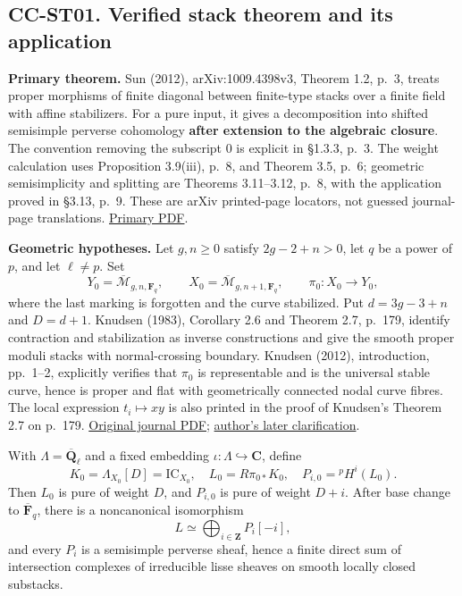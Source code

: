 \documentclass[11pt,a4paper]{article}
\theoremstyle{definition}\newtheorem{definition}[theorem]{Definition}
\theoremstyle{remark}\newtheorem{remark}[theorem]{Remark}
\begin{document}
\subsection{CC-ST01. Verified stack theorem and its
application}\label{cc-st01.-verified-stack-theorem-and-its-application}

\textbf{Primary theorem.} Sun (2012), arXiv:1009.4398v3, Theorem 1.2,
p.~3, treats proper morphisms of finite diagonal between finite-type
stacks over a finite field with affine stabilizers. For a pure input, it
gives a decomposition into shifted semisimple perverse cohomology
\textbf{after extension to the algebraic closure}. The convention
removing the subscript 0 is explicit in §1.3.3, p.~3. The weight
calculation uses Proposition 3.9(iii), p.~8, and Theorem 3.5, p.~6;
geometric semisimplicity and splitting are Theorems 3.11--3.12, p.~8,
with the application proved in §3.13, p.~9. These are arXiv printed-page
locators, not guessed journal-page translations.
\href{https://arxiv.org/pdf/1009.4398v3}{Primary PDF}.

\textbf{Geometric hypotheses.} Let \(g,n\geq0\) satisfy \(2g-2+n>0\),
let \(q\) be a power of \(p\), and let \(\ell\ne p\). Set \[
Y_0=\overline{\mathcal M}_{g,n,\mathbf F_q},\qquad
X_0=\overline{\mathcal M}_{g,n+1,\mathbf F_q},\qquad
\pi_0:X_0\longrightarrow Y_0,
\] where the last marking is forgotten and the curve stabilized. Put
\(d=3g-3+n\) and \(D=d+1\). Knudsen (1983), Corollary 2.6 and Theorem
2.7, p.~179, identify contraction and stabilization as inverse
constructions and give the smooth proper moduli stacks with
normal-crossing boundary. Knudsen (2012), introduction, pp.~1--2,
explicitly verifies that \(\pi_0\) is representable and is the universal
stable curve, hence is proper and flat with geometrically connected
nodal curve fibres. The local expression \(t_i\mapsto xy\) is also
printed in the proof of Knudsen's Theorem 2.7 on p.~179.
\href{https://journals.msp.org/mscand/article/download/1622/1621/1653}{Original
journal PDF}; \href{https://arxiv.org/pdf/1106.1588v2}{author's later
clarification}.

With \(\Lambda=\overline{\mathbf Q}_\ell\) and a fixed embedding
\(\iota:\Lambda\hookrightarrow\mathbf C\), define \[
K_0=\Lambda_{X_0}[D]=\mathrm{IC}_{X_0},\quad
L_0=R\pi_{0*}K_0,\quad
P_{i,0}={}^p\!H^i(L_0).
\] Then \(L_0\) is pure of weight \(D\), and \(P_{i,0}\) is pure of
weight \(D+i\). After base change to \(\overline{\mathbf F}_q\), there
is a noncanonical isomorphism \[
L\simeq\bigoplus_{i\in\mathbf Z}P_i[-i],
\] and every \(P_i\) is a semisimple perverse sheaf, hence a finite
direct sum of intersection complexes of irreducible lisse sheaves on
smooth locally closed substacks.
\end{document}
